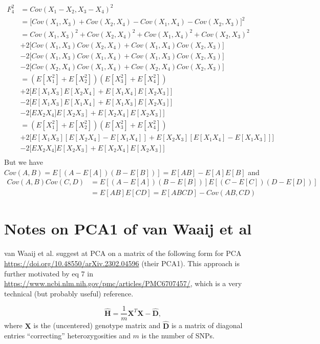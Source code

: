 \documentclass[12pt, letterpaper]{article}
\newcommand{\MX}{\mathbf{X}}
\begin{document}
\begin{align}
    F_4^2 &=  Cov(X_1 - X_2, X_3 - X_4) ^2 \nonumber\\
    &= \big[ Cov(X_1, X_3) + Cov(X_2, X_4) - Cov(X_1, X_4) - Cov(X_2, X_3)   \big]^2\nonumber\\
    &= Cov(X_1, X_3)^2 + Cov(X_2, X_4)^2 + Cov(X_1, X_4)^2 + Cov(X_2, X_3)^2  \nonumber\\
    &+2 \big[ Cov(X_1, X_3) Cov(X_2, X_4) + Cov(X_1, X_4) Cov(X_2, X_3)\big] \nonumber\\
    &-2 \big[ Cov(X_1, X_3) Cov(X_1, X_4) + Cov(X_1, X_3) Cov(X_2, X_3)\big] \nonumber\\
    &-2 \big[ Cov(X_2, X_4) Cov(X_1, X_4) + Cov(X_2, X_4) Cov(X_2, X_3)\big] \\
    &= (E[X_1^2] + E[X_2^2])(E[X_3^2] + E[X_4^2]) \nonumber\\
    &+2 \big[ E[X_1X_3]E[X_2X_4] + E[X_1 X_4] E[X_2 X_3]\big] \nonumber\\
    &-2 \big[ E[X_1 X_3] E[X_1 X_4] + E[X_1 X_3] E[X_2 X_3]\big] \nonumber\\
    &-2 \big[ EX_2 X_4] E[X_2 X_3] + E[X_2 X_4] E[X_2 X_3]\big] \\
    &= (E[X_1^2] + E[X_2^2])(E[X_3^2] + E[X_4^2]) \nonumber\\
    &+2 \big[ E[X_1X_3]  [ E[X_2X_4] - E[X_1 X_4]] +  E[X_2 X_3] [ E[X_1 X_4]  - E[X_1 X_3] ]\big] \nonumber\\
    &-2 \big[ EX_2 X_4] E[X_2 X_3] + E[X_2 X_4] E[X_2 X_3]\big] \nonumber\\
\end{align}
But we have $Cov(A,B) = E[ (A-E[A])(B-E[B])] = E[AB] - E[A]E[B]$ and 
\begin{align}
Cov(A, B)Cov(C, D) &= E[ (A-E[A]) (B-E[B])] E[(C-E[C])(D-E[D])]\nonumber\\
&= E[AB]E[CD] =  E[ABCD] - Cov(AB, CD)
\end{align}

\newpage
\section{Notes on PCA1 of van Waaij et al}
van Waaij et al. suggest at PCA on a matrix of the following form for PCA
\url{https://doi.org/10.48550/arXiv.2302.04596} (their PCA1). This approach is further motivated by eq 7 in \url{https://www.ncbi.nlm.nih.gov/pmc/articles/PMC6707457/}, which is a very technical (but probably useful) reference.

\begin{equation}
    \hat{\mathbf{H}} = \frac{1}{m}\mathbf{X}^T\mathbf{X} - \hat{\mathbf{D}},
\end{equation}
where $\MX$ is the (uncentered) genotype matrix and $\hat{\mathbf{D}}$ is a matrix of diagonal entries ``correcting'' heterozygosities and $m$ is the number of SNPs.
\end{document}
